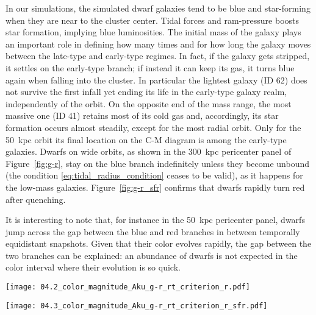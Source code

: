 In our simulations, the simulated dwarf galaxies tend to be blue and star-forming when they are near to the cluster center.
Tidal forces and ram-pressure boosts star formation, implying blue luminosities.
The initial mass of the galaxy plays an important role in defining how many times and for how long the galaxy moves between the late-type and early-type regimes.
In fact, if the galaxy gets stripped, it settles on the early-type branch; if instead it can keep its gas, it turns blue again when falling into the cluster.
In particular the lightest galaxy (ID 62) does not survive the first infall yet ending its life in the early-type galaxy realm, independently of the orbit.
On the opposite end of the mass range, the most massive one (ID 41) retains most of its cold gas and, accordingly, its star formation occurs almost steadily, except for the most radial orbit.
Only for the 50~kpc orbit its final location on the C-M diagram is among the early-type galaxies.
Dwarfs on wide orbits, as shown in the 300~kpc pericenter panel of Figure~\ref{fig:g-r}, stay on the blue branch indefinitely unless they become unbound (the condition \eqref{eq:tidal_radius_condition} ceases to be valid), as it happens for the low-mass galaxies.
Figure~\ref{fig:g-r_sfr} confirms that dwarfs rapidly turn red after quenching.

It is interesting to note that, for instance in the 50~kpc pericenter panel, dwarfs jump across the gap between the blue and red branches in between temporally equidistant snapshots.
Given that their color evolves rapidly, the gap between the two branches can be explained: an abundance of dwarfs is not expected in the color interval where their evolution is so quick.


\begin{sidewaysfigure}
\centering
\texttt{[image: 04.2\_color\_magnitude\_Aku\_g-r\_rt\_criterion\_r.pdf]}
\caption{SDSS bands colour magnitude diagram of galaxies on different orbits compared to Fornax dwarf catalogue of \citet{Venhola2019}.
Red and blue colour for the data points in the background represent dwarf elliptical (dE) and late type galaxy respectively, classified by eye on the base of morphology.
Empty squares are nucleated dE.
Data tracks of simulated galaxies are shown overlaid colour coded by the clustercentric radius.
The tracks are limited to bound galaxies \ie{} they are drawn with snapshots for which condition \eqref{eq:tidal_radius_condition} holds.
}
\label{fig:g-r}
\end{sidewaysfigure}
\begin{sidewaysfigure}
\centering
\texttt{[image: 04.3\_color\_magnitude\_Aku\_g-r\_rt\_criterion\_r\_sfr.pdf]}
\caption{Same as Figure~\ref{fig:g-r}, with point color coded with the specific star formation rate.
Black points are snapshots with no star formation.
}
\label{fig:g-r_sfr}
\end{sidewaysfigure}


